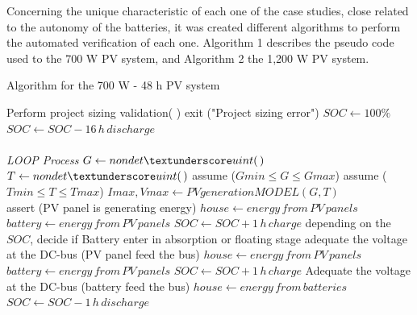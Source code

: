 \documentclass[journal]{IEEEtran}
\begin{document}
Concerning the unique characteristic of each one of the case studies, close related to the autonomy of the batteries, it was created different algorithms to perform the automated verification of each one. Algorithm 1 describes the pseudo code used to the 700 W PV system, and Algorithm 2 the 1,200 W PV system.



 \begin{algorithm}
 \caption{Algorithm for the 700 W - 48 h PV system}
 \begin{algorithmic}[1]
 \renewcommand{\algorithmicrequire}{\textbf{Input:}}
 \renewcommand{\algorithmicensure}{\textbf{Output:}}
  \STATE Perform project sizing validation( )
  \STATE exit ("Project sizing error")  
  \ENDIF
  \STATE $SOC \leftarrow 100\%$
  \\
  \STATE $SOC \leftarrow SOC - 16\,h\, discharge$
  \\
 \\ \textit{LOOP Process}
  \STATE $G \leftarrow nondet \textunderscore uint(\,)$ 
  \STATE $T \leftarrow nondet \textunderscore uint(\,)$ 
  \STATE assume ($Gmin \leq G \leq Gmax$) 
  \STATE assume ($Tmin \leq T \leq Tmax$) 
  \STATE $Imax, Vmax \leftarrow PVgenerationMODEL (G,T)$ 
  \\
    \STATE assert (PV panel is generating energy) 
    \STATE $house \leftarrow energy \, from \, PV \, panels$
    \STATE $battery \leftarrow energy \, from \, PV \, panels$ 
    \STATE $SOC \leftarrow SOC + 1\,h\, charge$
  	\STATE depending on the $SOC$, decide if Battery enter in absorption or floating stage
	\STATE adequate the voltage at the DC-bus (PV panel feed the bus)
    \STATE $house \leftarrow energy \, from \, PV \, panels$
    \STATE $battery \leftarrow energy \, from \, PV \, panels$ 
    \STATE $SOC \leftarrow SOC + 1\,h\, charge$
  \ELSE
  	\STATE Adequate the voltage at the DC-bus (battery feed the bus)
	\STATE $house \leftarrow energy \, from \, batteries$
    \STATE $SOC \leftarrow SOC - 1\,h\, discharge$

\end{algorithmic}
\end{algorithm}
\end{document}
